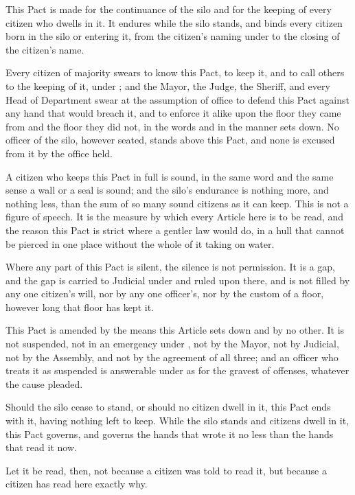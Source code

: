 \begin{clauses}
\item This Pact is made for the continuance of the silo and for the keeping of every citizen who dwells in it. It endures while the silo stands, and binds every citizen born in the silo or entering it, from the citizen's naming under  to the closing of the citizen's name.
\item Every citizen of majority swears to know this Pact, to keep it, and to call others to the keeping of it, under ; and the Mayor, the Judge, the Sheriff, and every Head of Department swear at the assumption of office to defend this Pact against any hand that would breach it, and to enforce it alike upon the floor they came from and the floor they did not, in the words and in the manner  sets down. No officer of the silo, however seated, stands above this Pact, and none is excused from it by the office held.
\item A citizen who keeps this Pact in full is sound, in the same word and the same sense a wall or a seal is sound; and the silo's endurance is nothing more, and nothing less, than the sum of so many sound citizens as it can keep. This is not a figure of speech. It is the measure by which every Article here is to be read, and the reason this Pact is strict where a gentler law would do, in a hull that cannot be pierced in one place without the whole of it taking on water.
\item Where any part of this Pact is silent, the silence is not permission. It is a gap, and the gap is carried to Judicial under  and ruled upon there, and is not filled by any one citizen's will, nor by any one officer's, nor by the custom of a floor, however long that floor has kept it.
\item This Pact is amended by the means this Article sets down and by no other. It is not suspended, not in an emergency under , not by the Mayor, not by Judicial, not by the Assembly, and not by the agreement of all three; and an officer who treats it as suspended is answerable under  as for the gravest of offenses, whatever the cause pleaded.
\item Should the silo cease to stand, or should no citizen dwell in it, this Pact ends with it, having nothing left to keep. While the silo stands and citizens dwell in it, this Pact governs, and governs the hands that wrote it no less than the hands that read it now.
\item Let it be read, then, not because a citizen was told to read it, but because a citizen has read here exactly why.
\end{clauses}
